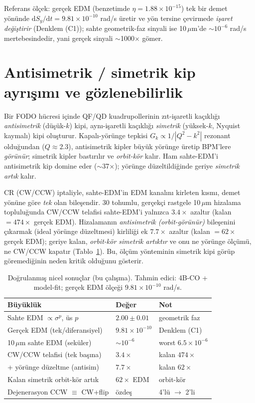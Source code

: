 \documentclass[twocolumn,a4paper,10pt]{article}
\begin{document}
Referans ölçek: gerçek EDM (benzetimde $\eta=1.88\times10^{-15}$) tek bir demet
yönünde $\mathrm{d}S_y/\mathrm{d}t = 9.81\times10^{-10}$ rad/s üretir ve yön
tersine çevirmede \emph{işaret değiştirir} (Denklem (C1)); sahte geometrik-faz
sinyali ise 10$\,\mu$m'de $\sim10^{-6}$ rad/s mertebesindedir, yani gerçek
sinyali $\sim$1000$\times$ gömer.

\section{Antisimetrik / simetrik kip ayrışımı ve gözlenebilirlik}
\label{sec:modes}
Bir FODO hücresi içinde QF/QD kuadrupollerinin zıt-işaretli kaçıklığı
\emph{antisimetrik} (düşük-$k$) kipi, aynı-işaretli kaçıklığı \emph{simetrik}
(yüksek-$k$, Nyquist kaymalı) kipi oluşturur. Kapalı-yörünge tepkisi
$G_k \propto 1/|Q^2-k^2|$ rezonant olduğundan ($Q \approx 2.3$), antisimetrik
kipler büyük yörünge üretip BPM'lere \emph{görünür}; simetrik kipler bastırılır ve
\emph{orbit-kör} kalır. Ham sahte-EDM'i antisimetrik kip domine eder
($\sim$37$\times$); yörünge düzeltildiğinde geriye \emph{simetrik artık} kalır.

CR (CW/CCW) iptaliyle, sahte-EDM'in EDM kanalını kirleten kısmı, demet
yönüne göre \emph{tek} olan bileşendir. 30 tohumlu, gerçekçi rastgele 10$\,\mu$m
hizalama topluluğunda CW/CCW telafisi sahte-EDM'i yalnızca $3.4\times$ azaltır
(kalan $= 474\times$ gerçek EDM). Hizalamanın \emph{antisimetrik (orbit-görünür)}
bileşenini çıkarmak (ideal yörünge düzeltmesi) kirliliği ek $7.7\times$ azaltır
(kalan $= 62\times$ gerçek EDM); geriye kalan, \emph{orbit-kör simetrik artıktır}
ve onu ne yörünge ölçümü, ne CW/CCW kapatır (Tablo~\ref{tab:results}). Bu, ölçüm
yönteminin simetrik kipi görüp göremediğinin neden kritik olduğunu gösterir.

\begin{table}[t]
\centering
\caption{Doğrulanmış nicel sonuçlar (bu çalışma). Tahmin edici: 4B-CO +
model-fit; gerçek EDM ölçeği $9.81\times10^{-10}$ rad/s.}
\label{tab:results}
\small
\begin{tabular}{@{}lll@{}}
\toprule
Büyüklük & Değer & Not \\
\midrule
Sahte EDM $\propto \sigma^p$, üs $p$ & $2.00\pm0.01$ & geometrik faz \\
Gerçek EDM (tek/diferansiyel) & $9.81\times10^{-10}$ & Denklem (C1) \\
10\,$\mu$m sahte EDM (seküler) & $\sim10^{-6}$ & worst $6.5\times10^{-6}$ \\
CW/CCW telafisi (tek başına) & $3.4\times$ & kalan $474\times$ \\
\;+ yörünge düzeltme (antisim) & $7.7\times$ & kalan $62\times$ \\
Kalan simetrik orbit-kör artık & $62\times$ EDM & orbit-kör \\
Dejenerasyon CCW $\equiv$ CW+flip & özdeş & 4'lü $\to$ 2'li \\
\bottomrule
\end{tabular}
\end{table}
\end{document}
